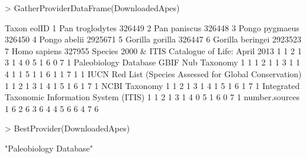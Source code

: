 \documentclass[12pt]{article}
\begin{document}
\begin{Schunk}
\begin{Sinput}
> GatherProviderDataFrame(DownloadedApes)
\end{Sinput}
\begin{Soutput}
             Taxon   eolID
1  Pan troglodytes  326449
2     Pan paniscus  326448
3   Pongo pygmaeus  326450
4     Pongo abelii 2925671
5  Gorilla gorilla  326447
6 Gorilla beringei 2923523
7     Homo sapiens  327955
  Species 2000 & ITIS Catalogue of Life: April 2013
1                                                 1
2                                                 1
3                                                 1
4                                                 0
5                                                 1
6                                                 0
7                                                 1
  Paleobiology Database GBIF Nub Taxonomy
1                     1                 1
2                     1                 1
3                     1                 1
4                     1                 1
5                     1                 1
6                     1                 1
7                     1                 1
  IUCN Red List (Species Assessed for Global Conservation)
1                                                        1
2                                                        1
3                                                        1
4                                                        1
5                                                        1
6                                                        1
7                                                        1
  NCBI Taxonomy
1             1
2             1
3             1
4             1
5             1
6             1
7             1
  Integrated Taxonomic Information System (ITIS)
1                                              1
2                                              1
3                                              1
4                                              0
5                                              1
6                                              0
7                                              1
  number.sources
1              6
2              6
3              6
4              4
5              6
6              4
7              6
\end{Soutput}
\begin{Sinput}
> BestProvider(DownloadedApes)
\end{Sinput}
\begin{Soutput}
[1] "Paleobiology Database"
\end{Soutput}
\end{Schunk}
\end{document}
